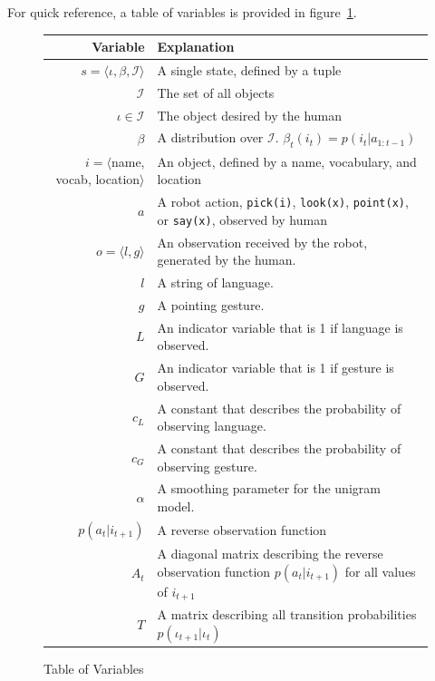 \documentclass[conference]{IEEEtran}
\newcommand{\Iota}{\mathcal{I}}
\begin{document}
For quick reference, a table of variables is provided in figure~\ref{fig:vars}. 

\begin{figure}
	\begin{center}
		\begin{tabular}{r l}
			\hline
			Variable & Explanation\\
			\hline
			$s = \langle \iota, \beta, \Iota \rangle$ & A single state, defined by a tuple \\
			$\Iota$ & The set of all objects \\
			$\iota \in \Iota$ & The object desired by the human \\
			$\beta$ & A distribution over $\Iota$. $\beta_t(i_t) = p(i_t | a_{1:t-1})$ \\
			$i = \langle$name, vocab, location$\rangle$ & An object, defined by a name, vocabulary, and location \\
			$a$ & A robot action, \texttt{pick(i)}, \texttt{look(x)}, \texttt{point(x)}, or \texttt{say(x)}, observed by human  \\
			$o = \langle l, g \rangle$ & An observation received by the robot, generated by the human.  \\
			$l$ & A string of language.  \\
			$g$ & A pointing gesture.  \\
			$L$ & An indicator variable that is 1 if language is observed.  \\
			$G$ & An indicator variable that is 1 if gesture is observed.  \\
			$c_L$ & A constant that describes the probability of observing language.  \\
			$c_G$ & A constant that describes the probability of observing gesture.  \\
			$\alpha$ & A smoothing parameter for the unigram model.  \\
			$p(a_t | i_{t+1})$ & A reverse observation function \\
			$A_t$ & A diagonal matrix describing the reverse observation function $p(a_t | i_{t+1})$ for all values of $i_{t+1}$ \\
			$T$ & A matrix describing all transition probabilities $p(\iota_{t+1}|\iota_{t})$ \\
			\hline
		\end{tabular}
		\caption{Table of Variables}
		\label{fig:vars}
	\end{center}
\end{figure}
\end{document}
